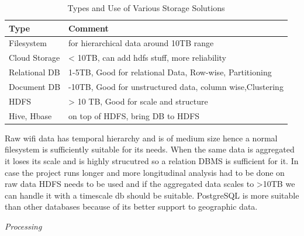 \begin{table}[h]
  \footnotesize
  \begin{center}
    \begin{tabular}{ll}
      \toprule
        Type & Comment\\
      \midrule
        Filesystem & for hierarchical data around 10TB range\\
        Cloud Storage & \textless{}  10TB, can add hdfs stuff, more reliability\\
        Relational DB & 1-5TB, Good for relational Data, Row-wise, Partitioning\\
        Document DB & -10TB, Good for unstructured data, column wise,Clustering\\
        HDFS & \textgreater{} 10 TB, Good for scale and structure\\
        Hive, Hbase & on top of HDFS, bring DB to HDFS\\
      \bottomrule
    \end{tabular}
  \end{center}
  \caption{Types and Use of Various Storage Solutions}
  \label{table:toolkit:storage}
\end{table}


Raw wifi data has temporal hierarchy and is of medium size hence a normal filesystem is sufficiently suitable for its needs.
When the same data is aggregated it loses its scale and is highly strucutred so a relation DBMS is sufficient for it.
In case the project runs longer and more longitudinal analysis had to be done on raw data HDFS needs to be used and if the aggregated data scales to >10TB we can handle it with a timescale db should be suitable.
PostgreSQL is more suitable than other databases because of its better support to geographic data.


\vspace{1.5em}\noindent\textit{Processing}\vspace{0.5em}

